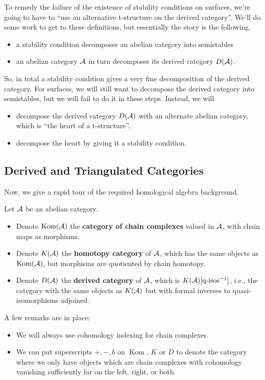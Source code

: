 \documentclass[12pt]{article}
\DeclareMathOperator{\Kom}{Kom}
\begin{document}
To remedy the failure of the existence of stability conditions on surfaces, we're going to have to ``use an alternative t-structure on the derived category''. We'll do some work to get to these definitions, but essentially the story is the following.
\begin{itemize}
    \item a stability condition decomposes an abelian category into semistables
    \item an abelian category $\mathcal{A}$ in turn decomposes its derived category $D(\mathcal{A})$.
\end{itemize}
So, in total a stability condition gives a very fine decomposition of the derived category. For surfaces, we will still want to decompose the derived category into semistables, but we will fail to do it in these steps. Instead, we will
\begin{itemize}
    \item decompose the derived category $D(\mathcal{A})$ with an alternate abelian category, which is ``the heart of a t-structure''.
    \item decompose the heart by giving it a stability condition.
\end{itemize}

\subsection{Derived and Triangulated Categories}

Now, we give a rapid tour of the required homological algebra background.

\begin{defn}
    Let $\mathcal{A}$ be an abelian category.
    \begin{itemize}
        \item Denote $\Kom(\cA)$ the \textbf{category of chain complexes} valued in $\mathcal{A}$, with chain maps as morphisms.
        \item Denote $K(\mathcal{A})$ the \textbf{homotopy category} of $\mathcal{A}$, which has the same objects as $\Kom(\cA)$, but morphisms are quotiented by chain homotopy.
        \item Denote $D(\mathcal{A})$ the \textbf{derived category} of $\mathcal{A}$, which is $K(\mathcal{A})[\text{q-isos}^{-1}]$, i.e., the category with the same objects as $K(\mathcal{A})$ but with formal inverses to quasi-isomorphisms adjoined.
    \end{itemize}
\end{defn}

\begin{rmk}
    A few remarks are in place:
    \begin{itemize}
        \item We will always use cohomology indexing for chain complexes.
        \item We can put superscripts $+,-,b$ on $\Kom$, $K$ or $D$ to denote the category where we only have objects which are chain complexes with cohomology vanishing sufficiently far on the left, right, or both.
    \end{itemize}
\end{rmk}
\end{document}
